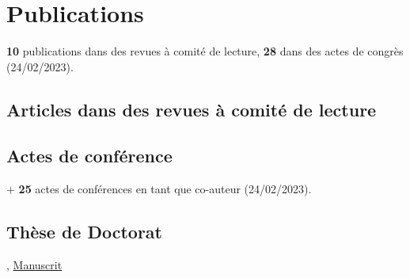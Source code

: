 \section{Publications}
\textbf{10} publications dans des revues à comité de lecture, \textbf{28} dans des actes de congrès (24/02/2023).

\subsection{Articles dans des revues à comité de lecture}

\tabitem {}

\tabitem {}

\tabitem {}

\tabitem {}

\tabitem {}

\tabitem {}

\tabitem {}

\tabitem {}

\tabitem {}

\tabitem {}

\subsection{Actes de conférence}
\tabitem {}

\tabitem {}

\tabitem {}

$+$ \textbf{25} actes de conférences en tant que co-auteur (24/02/2023).

\subsection{Thèse de Doctorat}
, \href{https://raw.githubusercontent.com/fkeruzore/PhDThesis-public/main/manuscrit.pdf}{Manuscrit}
